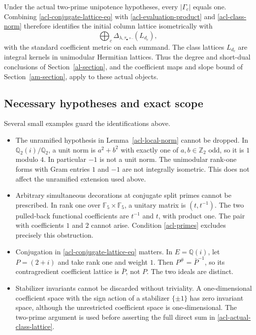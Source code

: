Under the actual two-prime unipotence hypotheses, every
$|\Gamma_c|$ equals one. Combining
\eqref{acl-conjugate-lattice-eq} with
\eqref{acl-evaluation-product} and \eqref{acl-class-norm}
therefore identifies the initial column lattice isometrically with
\begin{equation}\label{acl-actual-class-lattice}
                  \bigoplus_c
                         \Delta_{\lambda,\tau_\bullet\circ\bar{\ }}
                                      (L_{d_c}),
\end{equation}
with the standard coefficient metric on each summand.
The class lattices $L_{d_c}$ are integral kernels in unimodular
Hermitian lattices. Thus the degree and short-dual conclusions
of Section~\ref{al-section}, and the coefficient maps and slope
bound of Section~\ref{am-section}, apply to these actual objects.

\subsection{Necessary hypotheses and exact scope}

Several small examples guard the identifications above.

\begin{itemize}
\item The unramified hypothesis in Lemma~\ref{acl-local-norm}
cannot be dropped. In $\mathbb Q_2(i)/\mathbb Q_2$, a unit norm
is $a^2+b^2$ with exactly one of $a,b\in\mathbb Z_2$ odd,
so it is $1$ modulo $4$. In particular $-1$ is not a unit
norm. The unimodular rank-one forms with Gram entries $1$
and $-1$ are not integrally isometric. This does not affect
the unramified extension used above.
\item Arbitrary simultaneous decorations at conjugate split
primes cannot be prescribed. In rank one over
$\mathbb F_5\times\mathbb F_5$, a unitary matrix is
$(t,t^{-1})$. The two pulled-back functional coefficients
are $t^{-1}$ and $t$, with product one. The pair with
coefficients $1$ and $2$ cannot arise. Condition
\eqref{acl-primes} excludes precisely this obstruction.
\item Conjugation in \eqref{acl-conjugate-lattice-eq} matters.
In $E=\mathbb Q(i)$, let $P=(2+i)$ and take rank one and
weight $1$. Then $P^\#=\bar P^{-1}$, so its contragredient
coefficient lattice is $\bar P$, not $P$. The two ideals
are distinct.
\item Stabilizer invariants cannot be discarded without
triviality. A one-dimensional coefficient space with the
sign action of a stabilizer $\{\pm1\}$ has zero invariant
space, although the unrestricted coefficient space is
one-dimensional. The two-prime argument is used before
asserting the full direct sum in
\eqref{acl-actual-class-lattice}.
\end{itemize}

